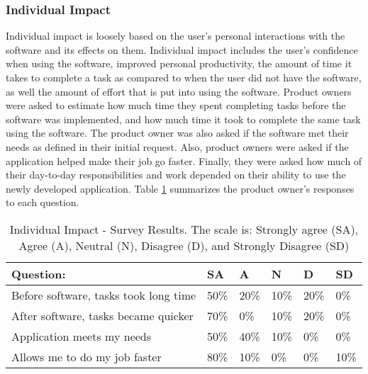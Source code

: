 
\subsubsection{Individual Impact}
Individual impact is loosely based on the user's personal interactions with the software and its effects on them. Individual impact includes the user's confidence when using the software, improved personal productivity, the amount of time it takes to complete a task as compared to when the user did not have the software, as well the amount of effort that is put into using the software. Product owners were asked to estimate how much time they spent completing tasks before the software was implemented, and how much time it took to complete the same task using the software. The product owner was also asked if the software met their needs as defined in their initial request. Also, product owners were asked if the application helped make their job go faster. Finally, they were asked how much of their day-to-day responsibilities and work depended on their ability to use the newly developed application. Table \ref{table:individualImpact} summarizes the product owner's responses to each question.


\begin{table}
\caption{Individual Impact - Survey Results. The scale is: Strongly agree (SA), Agree (A), Neutral (N), Disagree (D), and Strongly Disagree (SD)}
\label{table:individualImpact}
\begin{tabular}{p{4.3cm}p{.4cm}p{.4cm}p{.4cm}p{.4cm}p{.4cm}}
Question: & SA & A & N & D & SD \\
\hline
Before software, tasks took long time & 50\% & 20\% & 10\% & 20\% & 0\% \\
After software, tasks became quicker & 70\% & 0\% & 10\% & 20\% & 0\% \\
Application meets my needs & 50\% & 40\% & 10\% & 0\% & 0\% \\
Allows me to do my job faster & 80\% & 10\% & 0\% & 0\% & 10\% \\
\end{tabular}
\end{table}

